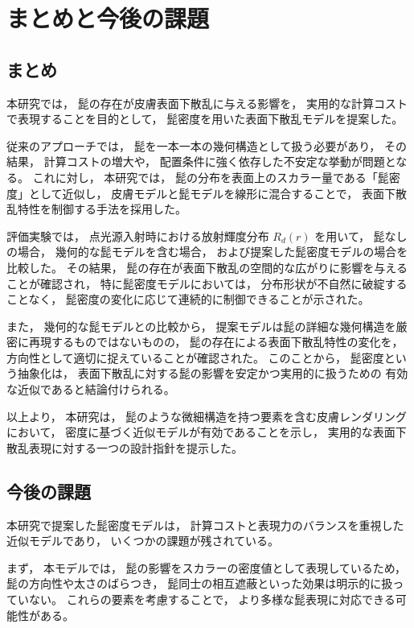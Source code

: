 \chapter{まとめと今後の課題}

\section{まとめ}

本研究では，
髭の存在が皮膚表面下散乱に与える影響を，
実用的な計算コストで表現することを目的として，
髭密度を用いた表面下散乱モデルを提案した。

従来のアプローチでは，
髭を一本一本の幾何構造として扱う必要があり，
その結果，
計算コストの増大や，
配置条件に強く依存した不安定な挙動が問題となる。
これに対し，
本研究では，
髭の分布を表面上のスカラー量である「髭密度」として近似し，
皮膚モデルと髭モデルを線形に混合することで，
表面下散乱特性を制御する手法を採用した。

評価実験では，
点光源入射時における放射輝度分布 $R_d(r)$ を用いて，
髭なしの場合，
幾何的な髭モデルを含む場合，
および提案した髭密度モデルの場合を比較した。
その結果，
髭の存在が表面下散乱の空間的な広がりに影響を与えることが確認され，
特に髭密度モデルにおいては，
分布形状が不自然に破綻することなく，
髭密度の変化に応じて連続的に制御できることが示された。

また，
幾何的な髭モデルとの比較から，
提案モデルは髭の詳細な幾何構造を厳密に再現するものではないものの，
髭の存在による表面下散乱特性の変化を，
方向性として適切に捉えていることが確認された。
このことから，
髭密度という抽象化は，
表面下散乱に対する髭の影響を安定かつ実用的に扱うための
有効な近似であると結論付けられる。

以上より，
本研究は，
髭のような微細構造を持つ要素を含む皮膚レンダリングにおいて，
密度に基づく近似モデルが有効であることを示し，
実用的な表面下散乱表現に対する一つの設計指針を提示した。

\section{今後の課題}

本研究で提案した髭密度モデルは，
計算コストと表現力のバランスを重視した近似モデルであり，
いくつかの課題が残されている。

まず，
本モデルでは，
髭の影響をスカラーの密度値として表現しているため，
髭の方向性や太さのばらつき，
髭同士の相互遮蔽といった効果は明示的に扱っていない。
これらの要素を考慮することで，
より多様な髭表現に対応できる可能性がある。


